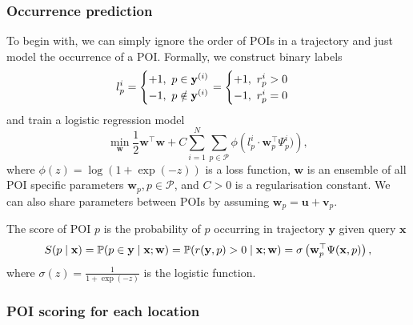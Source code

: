 \subsubsection{Occurrence prediction}
\label{sec:logistic}

To begin with, we can simply ignore the order of POIs in a trajectory and just model the occurrence of a POI.
Formally, we construct binary labels
\begin{equation*}
l_p^i = \begin{cases}
+1,~p \in \mathbf{y}^{(i)} \\
-1,~p \notin \mathbf{y}^{(i)}
\end{cases}
\hspace{-1em}
= \begin{cases}
+1,~ r_p^i > 0 \\
-1,~ r_p^i = 0
\end{cases}
\end{equation*}
and train a logistic regression model 
\begin{equation*}
\min_{\mathbf{w}} \frac{1}{2} \mathbf{w}^\top \mathbf{w} + 
C \sum_{i=1}^N \sum_{p \in \mathcal{P}} \phi \left( l_p^i \cdot \mathbf{w}_p^\top \Psi_p^i) \right), %
\end{equation*}
where $\phi(z) = \log(1+\exp(-z))$ is a loss function, $\mathbf{w}$ is an ensemble of all POI specific parameters $\mathbf{w}_p, p \in \mathcal{P}$,
and $C>0$ is a regularisation constant.
We can also share parameters between POIs by assuming $\mathbf{w}_p = \mathbf{u} + \mathbf{v}_p$.

The score of POI $p$ is the probability of $p$ occurring in trajectory $\mathbf{y}$ given query $\mathbf{x}$
\begin{equation*}
S(p \mid \mathbf{x})
= \mathbb{P}(p \in \mathbf{y} \mid \mathbf{x}; \mathbf{w})
= \mathbb{P}(r(\mathbf{y}, p) > 0 \mid \mathbf{x}; \mathbf{w})
= \sigma \left( \mathbf{w}_p^\top \Psi(\mathbf{x}, p) \right),
\end{equation*}
where $\sigma(z) = \frac{1}{1+\exp({-z})}$ is the logistic function.



\subsubsection{POI scoring for each location}
\label{sec:multi}

